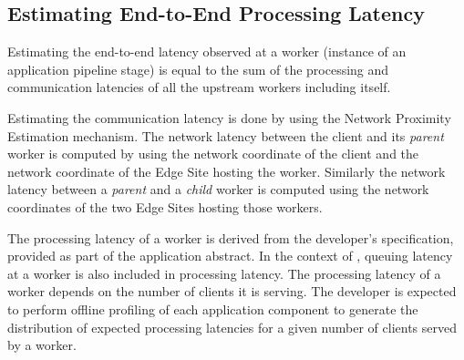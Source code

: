 \subsection{Estimating End-to-End Processing Latency}
\par Estimating the end-to-end latency observed at a worker (instance of an application pipeline stage) is equal to the sum of the processing and communication latencies of all the upstream workers including itself. 
\par Estimating the communication latency is done by using the Network Proximity Estimation mechanism. The network latency between the client and its \textit{parent} worker is computed by using the network coordinate of the client and the network coordinate of the Edge Site hosting the worker. Similarly the network latency between a \textit{parent} and a \textit{child} worker is computed using the network coordinates of the two Edge Sites hosting those workers.
\par The processing latency of a worker is derived from the developer's specification, provided as part of the application abstract. In the context of \oneedge{}, queuing latency at a worker is also included in processing latency. The processing latency of a worker depends on the number of clients it is serving. The developer is expected to perform offline profiling of each application component to generate the distribution of expected processing latencies for a given number of clients served by a worker.

